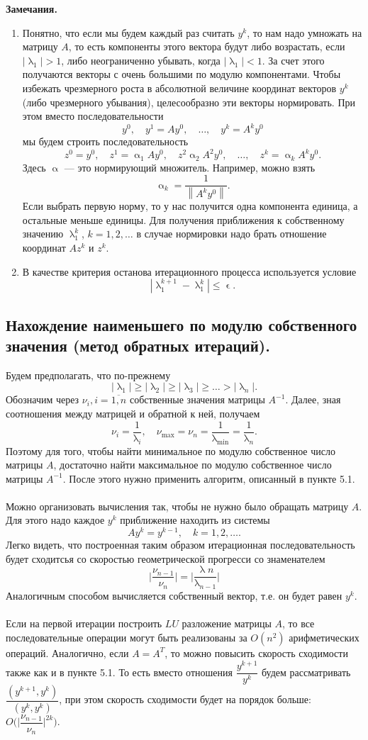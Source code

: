 \documentclass[a4paper, 12pt]{report}
\renewcommand{\leq}{\leqslant}
\renewcommand{\geq}{\geqslant}
\renewcommand{\alpha}{\upalpha}
\renewcommand{\lambda}{\uplambda}
\renewcommand{\epsilon}{\upvarepsilon}
\newcommand\Norm[1]{\left\| #1 \right\|}
\begin{document}
	\textbf{Замечания.}\begin{enumerate}
		\item Понятно, что если мы будем каждый раз считать $y^k$, то нам надо умножать на матрицу $A$, то есть компоненты этого вектора будут либо возрастать, если $|\lambda_1| > 1$, либо неограниченно убывать, когда $|\lambda_1| < 1$. За счет этого получаются векторы с очень большими по модулю компонентами. Чтобы избежать чрезмерного роста в абсолютной величине координат векторов $y^k$ (либо чрезмерного убывания), целесообразно эти векторы нормировать. При этом вместо последовательности $$y^0,\quad y^1 = Ay^0,\quad\ldots,\quad y^k = A^ky^0$$ мы будем строить последовательность $$z^0 = y^0,\quad z^1 = \alpha_1 Ay^0,\quad z^2\alpha_2A^2y^0,\quad\ldots,\quad z^k = \alpha_kA^ky^0.$$
		Здесь $\alpha$ --- это нормирующий множитель. Например, можно взять$$\alpha_k = \dfrac{1}{\Norm{A^ky^0}}.$$ Если выбрать первую норму, то у нас получится одна компонента единица, а остальные меньше единицы. Для получения приближения к собственному значению $\lambda_1^k$, $k=1,2,\ldots$ в случае нормировки надо брать отношение координат $Az^k$ и $z^k$.
		\item В качестве критерия останова итерационного процесса используется условие $$|\lambda_1^{k+1} - \lambda_1^k|\leq \epsilon.$$
	\end{enumerate}
	\subsection{Нахождение наименьшего по модулю собственного значения (метод обратных итераций).}
	Будем предполагать, что по-прежнему 
		$$|\lambda_1| \geq |\lambda_2| \geq |\lambda_3| \geq \ldots > |\lambda_n|.$$ Обозначим через $\nu_i, i = \overline{1,n}$ собственные значения матрицы $A^{-1}$. Далее, зная соотношения между матрицей и обратной к ней, получаем $$\nu_i = \dfrac{1}{\lambda_i},\quad \nu_{\max} = \nu_n = \dfrac{1}{\lambda_{\min}} = \dfrac{1}{\lambda_n}.$$
	Поэтому для того, чтобы найти минимальное по модулю собственное число матрицы $A$, достаточно найти максимальное по модулю собственное число матрицы $A^{-1}$. После этого нужно применить алгоритм, описанный в пункте 5.1. \\\\
	Можно организовать вычисления так, чтобы не нужно было обращать матрицу $A$. Для этого надо каждое $y^k$ приближение находить из системы $$Ay^k = y^{k-1},\quad k=1,2,\ldots.$$
	Легко видеть, что построенная таким образом итерационная последовательность будет сходитсья со скоростью геометрической прогресси со знаменателем $$\Big|\dfrac{\nu_{n-1}}{\nu_n}\Big| = \Big|\dfrac{\lambda{n}}{\lambda_{n-1}}\Big|$$
	Аналогичным способом вычисляется собственный вектор, т.е. он будет равен $y^k$.\\\\
	Если на первой итерации построить $LU$ разложение матрицы $A$, то все последовательные операции могут быть реализованы за $O(n^2)$ арифметических операций. Аналогично, если $A = A^T$, то можно повысить скорость сходимости также как и в пункте 5.1. То есть вместо отношения $\dfrac{y^{k+1}}{y^k}$ будем рассматривать $\dfrac{(y^{k+1}, y^k)}{(y^k, y^k)}$, при этом скорость сходимости будет на порядок больше: $O\Big(\big|\dfrac{\nu_{n-1}}{\nu_n}\big|^{2k}\Big).$
\end{document}
